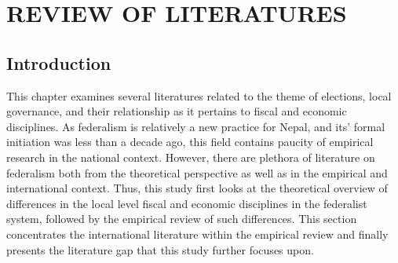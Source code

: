 \newpage
\section{REVIEW OF LITERATURES} 
\subsection{Introduction} \vspace{-3mm}
This chapter examines several literatures related to the theme of elections, local governance, and their relationship as it pertains to fiscal and economic disciplines. As federalism is relatively a new practice for Nepal, and its' formal initiation was less than a decade ago, this field contains paucity of empirical research in the national context. However, there are plethora of literature on federalism both from the theoretical perspective as well as in the empirical and international context. Thus, this study first looks at the theoretical overview of differences in the local level fiscal and economic disciplines in the federalist system, followed by the empirical review of such differences. This section concentrates the international literature within the empirical review and finally presents the literature gap that this study further focuses upon. \vspace{-5mm}
